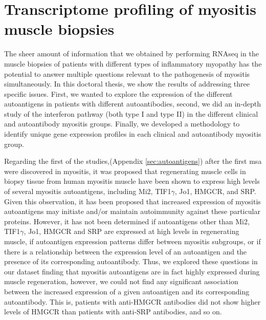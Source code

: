 \section{Transcriptome profiling of myositis muscle biopsies}

The sheer amount of information that we obtained by performing RNAseq in the muscle biopsies of patients with different types of inflammatory myopathy has the potential to answer multiple questions relevant to the pathogenesis of myositis simultaneously. In this doctoral thesis, we show the results of addressing three specific issues. First, we wanted to explore the expression of the different autoantigens in patients with different autoantibodies, second, we did an in-depth study of the interferon pathway (both type I and type II) in the different clinical and autoantibody myositis groups. Finally, we developed a methodology to identify unique gene expression profiles in each clinical and autoantibody myositis group.

Regarding the first of the studies,(Appendix \autoref{sec:autoantigens}) after the first \gls{msa} were discovered in myositis, it was proposed that regenerating muscle cells in biopsy tissue from human myositis muscle have been shown to express high levels of several myositis autoantigens, including Mi2, TIF1$\gamma$, Jo1, HMGCR, and SRP.\cite{Mohassel2015,Mammen2009,CasciolaRosen2005,Allenbach2018} Given this observation, it has been proposed that increased expression of myositis autoantigens may initiate and/or maintain autoimmunity against these particular proteins. However, it has not been determined if autoantigens other than Mi2, TIF1$\gamma$, Jo1, HMGCR and SRP are expressed at high levels in regenerating muscle, if autoantigen expression patterns differ between myositis subgroups, or if there is a relationship between the expression level of an autoantigen and the presence of its corresponding autoantibody. Thus, we explored these questions in our dataset finding that myositis autoantigens are in fact highly expressed during muscle regeneration, however, we could not find any significant association between the increased expression of a given autoantigen and its corresponding autoantibody. This is, patients with anti-HMGCR antibodies did not show higher levels of HMGCR than patients with anti-SRP antibodies, and so on.

